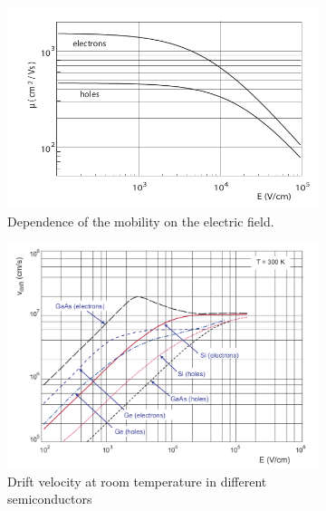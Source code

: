    \begin{figure}
      \centering
      \begin{subfigure}[b]{0.49\textwidth}
          \centering
          \includegraphics[width=\linewidth]{figures/Pixel_detectors/mobility_in_semiconductor.png}
          \caption{Dependence of the mobility on the electric field.}
          \label{fig:mobility}
      \end{subfigure}
      \hfill
      \begin{subfigure}[b]{0.49\textwidth}
          \centering
          \includegraphics[width=\linewidth]{figures/Pixel_detectors/velocity_in_semiconductor.png}          
          \caption{Drift velocity at room temperature in different semiconductors}
          \label{fig:Drift_velocity}
      \end{subfigure}
         \caption{}
         \label{fig:mobility_drift}
 \end{figure}
 
